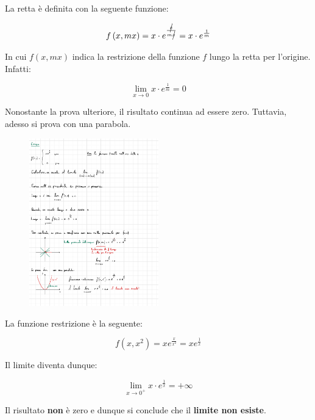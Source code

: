 \documentclass[a4paper]{article}
\begin{document}
	\noindent
	La retta è definita con la seguente funzione:
	
	\begin{equation*}
		f\left(x, mx\right) = x \cdot e^{\frac{\cancel{x}}{m\cancel{x}}} = x \cdot e^{\frac{1}{m}}
	\end{equation*}

	\noindent
	In cui $f\left(x, mx\right)$ indica la restrizione della funzione $f$ lungo la retta per l'origine. Infatti:
	
	\begin{equation*}
		\lim_{x \rightarrow 0} x \cdot e^{\frac{1}{m}} = 0
	\end{equation*}

	\noindent
	Nonostante la prova ulteriore, il risultato continua ad essere zero. Tuttavia, adesso si prova con una parabola.
	
	\begin{figure}[!htp]
		\centering
		\includegraphics[width=0.5\textwidth]{img/limiti_ex2.pdf}
	\end{figure}

	\noindent
	La funzione restrizione è la seguente:
	
	\begin{equation*}
		f\left(x,x^{2}\right) = x e^{\frac{x}{x^{2}}} = xe^{\frac{1}{x}}
	\end{equation*}

	\noindent
	Il limite diventa dunque:
	
	\begin{equation*}
		\lim_{x \rightarrow 0^{+}} x \cdot e^{\frac{1}{x}} = +\infty
	\end{equation*}

	\noindent
	Il risultato \textbf{non} è zero e dunque si conclude che il \textbf{limite non esiste}.
	
\end{document}
